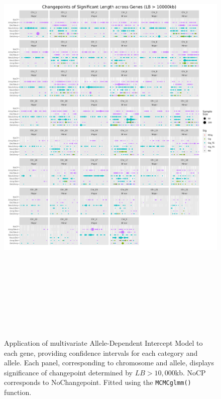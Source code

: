 \begin{figure}[H]
\centering
\includegraphics[width = 1\textwidth, height = 22cm]{../figures/Chapter_6/PerGene_MCMC_10000_Thesis.png}
\caption[Application of multivariate Allele-Dependent Intercept Model to each gene ($LB > 10,000$kb).]{Application of multivariate Allele-Dependent Intercept Model to each gene, providing confidence intervals for each category and allele. Each panel, corresponding to chromosome and allele, displays significance of changepoint determined by $LB > 10,000$kb. NoCP corresponds to NoChangepoint. Fitted using the \texttt{MCMCglmm()} function.}
\label{fig:PerGene_10000_MCMC}
\end{figure}


